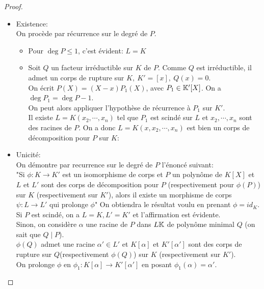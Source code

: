 \begin{proof}
	\begin{itemize}
		\item Existence:\\
		      On procède par récurrence sur le degré de $P$.
		      \begin{itemize}
			      \item Pour $\deg P \leq 1$, c'est évident: $L = K$
			      \item Soit $Q$ un facteur irréductible sur $K$ de $P$.
			            Comme $Q$ est irréductible, il admet un corps de rupture sur $K, \ K' = [x], \ Q(x) = 0$.\\
			            On écrit $P(X) = (X-x)P_1(X)$, avec $P_1 \in \mathbb{K}'[X]$. On a $\deg P_1 = \deg P -1$.\\
			            On peut alors appliquer l'hypothèse de récurrence à $P_1$ sur $K'$.\\
			            Il existe $L = K(x_2, \cdots,  x_n)$ tel que $P_1$ est scindé sur $L$ et
			            $x_2, \cdots, x_n$ sont des racines de $P$. On a donc $L = K(x, x_2, \cdots, x_n)$ est bien un
			            corps de décomposition pour $P$ sur $K$:
		      \end{itemize}
		\item Unicité:\\
		      On démontre par recurrence sur le degré de $P$ l'énoncé suivant:\\
		      "Si $\phi : K \to K'$ est un isomorphisme de corps et $P$ un polynôme de $K[X]$ et $L$ et $L'$
		      sont des corps de décomposition pour $P$ (respectivement pour $\phi(P)$) sur $K$ (respectivement sur $K'$),
		      alors il existe un morphisme de corps $\psi: L \to L'$ qui prolonge $\phi$"
		      On obtiendra le résultat voulu en prenant $\phi = id_K$.\\

		      Si $P$ est scindé, on a $L=K, L'=K'$ et l'affirmation est évidente.\\

		      Sinon, on considère $\alpha$ une racine de $P$ dans $L\mathbb{K}$ de polynôme minimal $Q$ (on sait que $Q \mid P$).\\
		      $\phi (Q)$ admet une racine $\alpha' \in L'$ et $K[\alpha]$ et $K'[\alpha']$ sont des corps de rupture sur $Q$(respectivement $\phi(Q)$)
		      sur $K$ (respectivement sur $K'$).\\

		      On prolonge $\phi$ en $\phi_1 : K[\alpha] \to K'[\alpha']$ en posant $\phi_1(\alpha) = \alpha'$.\\


\end{itemize}
\end{proof}
